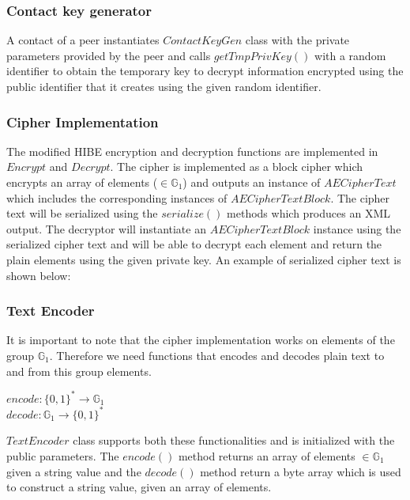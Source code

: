 


\subsubsection{Contact key generator}
A contact of a peer instantiates $ContactKeyGen$ class with the private parameters provided by the peer and calls $getTmpPrivKey()$ with a random identifier to obtain the temporary key to decrypt information encrypted using the public identifier that it creates using the given random identifier.\\

\subsubsection{Cipher Implementation}
The modified HIBE encryption and decryption functions are implemented in $Encrypt$ and $Decrypt$. The cipher is implemented as a block cipher which encrypts an array of elements ($\in \mathbb{G}_1$) and outputs an instance of $AECipherText$ which includes the corresponding instances of $AECipherTextBlock$. The cipher text will be serialized using the $serialize()$ methods which produces an XML output. The decryptor will instantiate an $AECipherTextBlock$ instance using the serialized cipher text and will be able to decrypt each element and return the plain elements using the given private key. An example of serialized cipher text is shown below:\\

\subsubsection{Text Encoder}
It is important to note that the cipher implementation works on elements of the group $\mathbb{G}_1$. Therefore we need functions that encodes and decodes plain text to and from this group elements.
\begin{center}
$encode : {\{0,1\}}^* \rightarrow \mathbb{G}_1$\\
$decode : \mathbb{G}_1 \rightarrow {\{0,1\}}^*$\\
\end{center}

$TextEncoder$ class supports both these functionalities and is initialized with the public parameters. The $encode()$ method returns an array of elements $\in \mathbb{G}_1$ given a string value and the $decode()$ method return a byte array which is used to construct a string value, given an array of elements. \\

